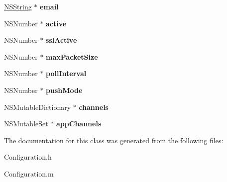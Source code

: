 \begin{DoxyCompactItemize}
\item 
\hypertarget{interface_configuration_ae4d52b4b96f3eb24c64c278a81195e5d}{
\hyperlink{class_n_s_string}{\-N\-S\-String} $\ast$ {\bfseries email}}
\label{interface_configuration_ae4d52b4b96f3eb24c64c278a81195e5d}

\item 
\hypertarget{interface_configuration_ac70e8b8f296c2a1980e2905f0b090f8c}{
\-N\-S\-Number $\ast$ {\bfseries active}}
\label{interface_configuration_ac70e8b8f296c2a1980e2905f0b090f8c}

\item 
\hypertarget{interface_configuration_a13631f1d7b87922819aaaf457aa004b5}{
\-N\-S\-Number $\ast$ {\bfseries ssl\-Active}}
\label{interface_configuration_a13631f1d7b87922819aaaf457aa004b5}

\item 
\hypertarget{interface_configuration_a3663b860903a375dde1f331e06fa2700}{
\-N\-S\-Number $\ast$ {\bfseries max\-Packet\-Size}}
\label{interface_configuration_a3663b860903a375dde1f331e06fa2700}

\item 
\hypertarget{interface_configuration_a40b7ff06c325a79d01a9c90d5f679a0b}{
\-N\-S\-Number $\ast$ {\bfseries poll\-Interval}}
\label{interface_configuration_a40b7ff06c325a79d01a9c90d5f679a0b}

\item 
\hypertarget{interface_configuration_a8c8d5a663a660ea7f8f330b918136190}{
\-N\-S\-Number $\ast$ {\bfseries push\-Mode}}
\label{interface_configuration_a8c8d5a663a660ea7f8f330b918136190}

\item 
\hypertarget{interface_configuration_ab9e05a79bd581c3e24503b8036c484e9}{
\-N\-S\-Mutable\-Dictionary $\ast$ {\bfseries channels}}
\label{interface_configuration_ab9e05a79bd581c3e24503b8036c484e9}

\item 
\hypertarget{interface_configuration_a021ae22c9e69b44971b61e293b179c38}{
\-N\-S\-Mutable\-Set $\ast$ {\bfseries app\-Channels}}
\label{interface_configuration_a021ae22c9e69b44971b61e293b179c38}

\end{DoxyCompactItemize}


\-The documentation for this class was generated from the following files\-:\begin{DoxyCompactItemize}
\item 
\-Configuration.\-h\item 
\-Configuration.\-m\end{DoxyCompactItemize}

